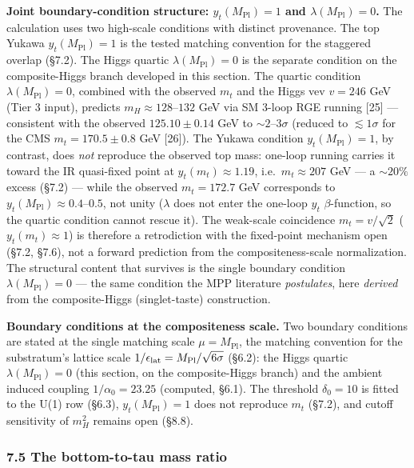 \documentclass[
]{article}
\begin{document}
\textbf{Joint boundary-condition structure: \(y_t(M_{\mathrm{Pl}}) = 1\)
and \(\lambda(M_{\mathrm{Pl}}) = 0\).} The calculation uses two
high-scale conditions with distinct provenance. The top Yukawa
\(y_t(M_{\mathrm{Pl}}) = 1\) is the tested matching convention for the
staggered overlap (§7.2). The Higgs quartic
\(\lambda(M_{\mathrm{Pl}}) = 0\) is the separate condition on the
composite-Higgs branch developed in this section. The quartic condition
\(\lambda(M_{\mathrm{Pl}}) = 0\), combined with the observed \(m_t\) and
the Higgs vev \(v = 246\) GeV (Tier 3 input), predicts
\(m_H \approx 128\)--\(132\) GeV via SM 3-loop RGE running {[}25{]} ---
consistent with the observed \(125.10 \pm 0.14\) GeV to
\(\sim 2\)--\(3\sigma\) (reduced to \(\lesssim 1\sigma\) for the CMS
\(m_t = 170.5 \pm 0.8\) GeV {[}26{]}). The Yukawa condition
\(y_t(M_{\mathrm{Pl}}) = 1\), by contrast, does \emph{not} reproduce the
observed top mass: one-loop running carries it toward the IR quasi-fixed
point at \(y_t(m_t) \approx 1.19\), i.e.~\(m_t \approx 207\) GeV --- a
\(\sim 20\%\) excess (§7.2) --- while the observed \(m_t = 172.7\) GeV
corresponds to \(y_t(M_{\mathrm{Pl}}) \approx 0.4\)--\(0.5\), not unity
(\(\lambda\) does not enter the one-loop \(y_t\) \(\beta\)-function, so
the quartic condition cannot rescue it). The weak-scale coincidence
\(m_t = v/\sqrt{2}\) (\(y_t(m_t) \approx 1\)) is therefore a
retrodiction with the fixed-point mechanism open (§7.2, §7.6), not a
forward prediction from the compositeness-scale normalization. The
structural content that survives is the single boundary condition
\(\lambda(M_{\mathrm{Pl}}) = 0\) --- the same condition the MPP
literature \emph{postulates}, here \emph{derived} from the
composite-Higgs (singlet-taste) construction.

\textbf{Boundary conditions at the compositeness scale.} Two boundary
conditions are stated at the single matching scale
\(\mu = M_{\mathrm{Pl}}\), the matching convention for the substratum's
lattice scale \(1/\epsilon_{\rm lat} = M_{\mathrm{Pl}}/\sqrt{6\sigma}\)
(§6.2): the Higgs quartic \(\lambda(M_{\mathrm{Pl}}) = 0\) (this
section, on the composite-Higgs branch) and the ambient induced coupling
\(1/\alpha_0 = 23.25\) (computed, §6.1). The threshold \(\delta_0 = 10\)
is fitted to the U(1) row (§6.3), \(y_t(M_{\mathrm{Pl}}) = 1\) does not
reproduce \(m_t\) (§7.2), and cutoff sensitivity of \(m_H^2\) remains
open (§8.8).

\hypertarget{the-bottom-to-tau-mass-ratio}{%
\subsubsection{7.5 The bottom-to-tau mass
ratio}\label{the-bottom-to-tau-mass-ratio}}
\end{document}
